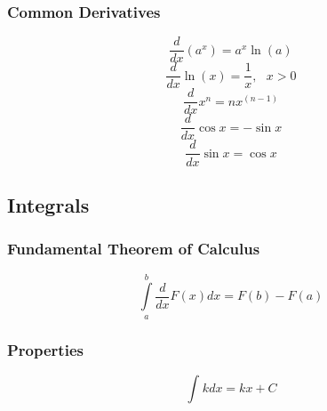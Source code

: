 \documentclass{article}
\begin{document}
		\subsubsection{Common Derivatives}
			\begin{equation}
				\frac{d}{{dx}}\left(a^x\right)=a^x\ln(a)
			\end{equation}
			\begin{equation}
				\frac{d}{{dx}}\ln \left( x \right) = \frac{1}{x}, \ \ \ x > 0
			\end{equation}
			\begin{equation}
				\frac{d}{{dx}}x^n = nx^{\left( {n - 1} \right)}
			\end{equation}
			\begin{equation}
				\frac{d}{{dx}}\cos x = -\sin x
			\end{equation}
			\begin{equation}
				\frac{d}{{dx}}\sin x = \cos x
			\end{equation}
	\subsection{Integrals}
		\subsubsection{Fundamental Theorem of Calculus}
			\begin{equation}
			\int\limits_a^b {\frac{d}{{dx}}F\left( x \right)dx} = F\left( b \right) - F\left( a \right)
			\end{equation}
		\subsubsection{Properties}
			\begin{equation}
				\int_{}^{}k dx = kx + C
			\end{equation}
\end{document}
